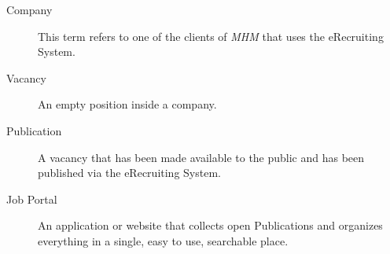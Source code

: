 \begin{description}
\item[Company] This term refers to one of the clients of \textit{MHM} that uses the eRecruiting System.
\item[Vacancy] An empty position inside a company.
\item[Publication] A vacancy that has been made available to the public and has been published via the eRecruiting System.
\item[Job Portal] An application or website that collects open Publications and organizes everything in a single, easy to use, searchable place.
\end{description}


















 
   
